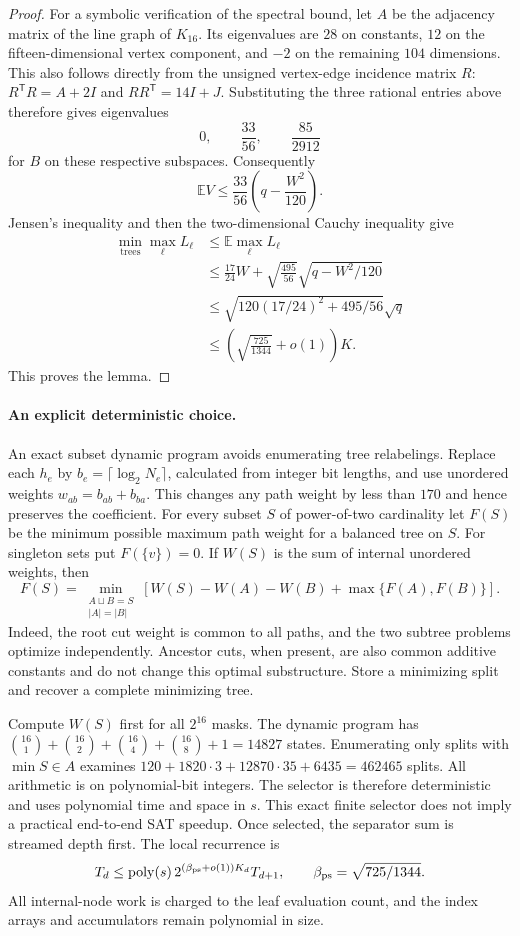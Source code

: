 \begin{proof}
For a symbolic verification of the spectral bound, let $A$ be the adjacency
matrix of the line graph of $K_{16}$. Its eigenvalues are $28$ on constants,
$12$ on the fifteen-dimensional vertex component, and $-2$ on the
remaining $104$ dimensions. This also follows directly from the unsigned
vertex-edge incidence matrix $R$: $R^{\mathsf T}R=A+2I$ and
$RR^{\mathsf T}=14I+J$. Substituting the three rational entries above
therefore gives eigenvalues
\[
 0,\qquad \frac{33}{56},\qquad \frac{85}{2912}
\]
for $B$ on these respective subspaces. Consequently
\[
 \mathbb E V\le\frac{33}{56}\left(q-\frac{W^2}{120}\right).
\]
Jensen's inequality and then the two-dimensional Cauchy inequality give
\begin{align*}
 \min_{\text{trees}}\max_\ell L_\ell
 &\le\mathbb E\max_\ell L_\ell\\
 &\le\frac{17}{24}W+
       \sqrt{\frac{495}{56}}\sqrt{q-W^2/120}\\
 &\le\sqrt{120(17/24)^2+495/56}\sqrt q\\
 &\le\left(\sqrt{\frac{725}{1344}}+o(1)\right)K.
\end{align*}
This proves the lemma.
\end{proof}

\paragraph{An explicit deterministic choice.}
An exact subset dynamic program avoids enumerating tree relabelings.
Replace each $h_e$ by $b_e=\lceil\log_2N_e\rceil$, calculated from integer
bit lengths, and use unordered weights $w_{ab}=b_{ab}+b_{ba}$. This changes
any path weight by less than $170$ and hence preserves the coefficient.
For every subset $S$ of power-of-two cardinality let $F(S)$ be the minimum
possible maximum path weight for a balanced tree on $S$. For singleton sets
put $F(\{v\})=0$. If $W(S)$ is the sum of internal unordered weights, then
\[
 F(S)=\min_{\substack{A\sqcup B=S\\|A|=|B|}}
 \left[W(S)-W(A)-W(B)+\max\{F(A),F(B)\}\right].
\]
Indeed, the root cut weight is common to all paths, and the two subtree
problems optimize independently. Ancestor cuts, when present, are also
common additive constants and do not change this optimal substructure.
Store a minimizing split and recover a complete minimizing tree.

Compute $W(S)$ first for all $2^{16}$ masks. The dynamic program has
$\binom{16}{1}+\binom{16}{2}+\binom{16}{4}+\binom{16}{8}+1=14827$
states. Enumerating only splits with $\min S\in A$ examines
$120+1820\cdot3+12870\cdot35+6435=462465$ splits. All arithmetic is on
polynomial-bit integers. The selector is therefore deterministic and uses
polynomial time and space in $s$. This exact finite selector does not imply
a practical end-to-end SAT speedup. Once selected, the separator sum is
streamed depth first. The local recurrence is
\[
 T_d\le\operatorname{poly}(s)\,
 2^{(\beta_{\rm ps}+o(1))K_d}T_{d+1},\qquad
 \beta_{\rm ps}=\sqrt{725/1344}.
\]
All internal-node work is charged to the leaf evaluation count, and the
index arrays and accumulators remain polynomial in size.

